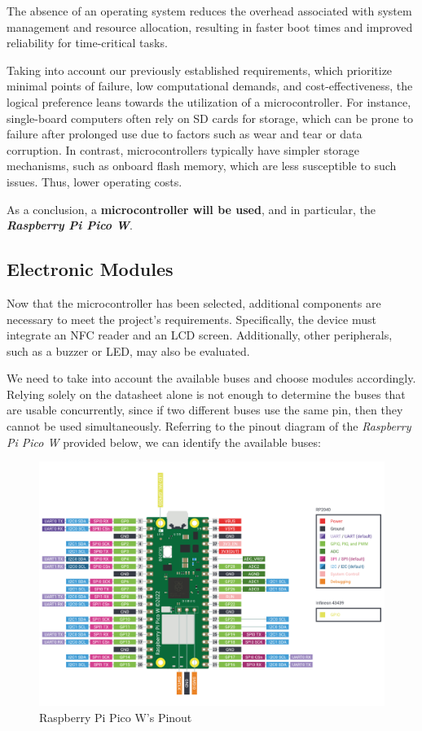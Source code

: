 The absence of an operating system reduces the overhead associated with system management and resource allocation, resulting 
in faster boot times and improved reliability for time-critical tasks.

Taking into account our previously established requirements, which prioritize minimal points of failure, low computational 
demands, and cost-effectiveness, the logical preference leans towards the utilization of a microcontroller. For instance, 
single-board computers often rely on SD cards for storage, which can be prone to failure after prolonged use due to factors 
such as wear and tear or data corruption. In contrast, microcontrollers typically have simpler storage mechanisms, such as 
onboard flash memory, which are less susceptible to such issues. Thus, lower operating costs.

As a conclusion, a \textbf{microcontroller will be used}, and in particular, the \textit{\textbf{Raspberry Pi Pico W}}.

%
%
\subsection{Electronic Modules}

Now that the microcontroller has been selected, additional components are necessary to meet the project's requirements. 
Specifically, the device must integrate an NFC reader and an LCD screen. Additionally, other peripherals, such as a buzzer 
or LED, may also be evaluated.

We need to take into account the available buses and choose modules accordingly. Relying solely on the datasheet alone is 
not enough to determine the buses that are usable concurrently, since if two different buses use the same pin, then they 
cannot be used simultaneously. Referring to the pinout diagram of the \textit{Raspberry Pi Pico W} provided below, we can 
identify the available buses:

\begin{figure}[h]
	\centering
	\includegraphics[width = 1\textwidth]{Imagenes/Vectorial/picow-pinout.pdf}
	\caption{Raspberry Pi Pico W's Pinout}
	\label{fig:piPicoPinout}
\end{figure}

